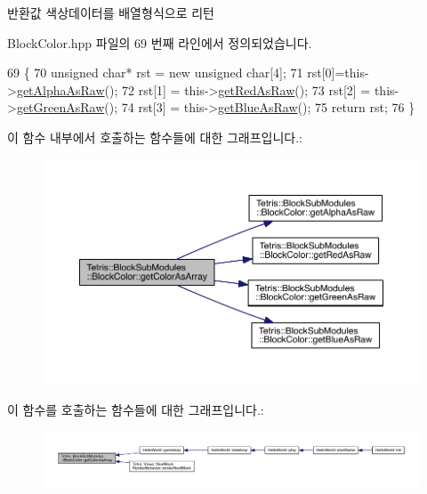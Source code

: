 \begin{DoxyReturn}{반환값}
색상데이터를 배열형식으로 리턴 
\end{DoxyReturn}


Block\+Color.\+hpp 파일의 69 번째 라인에서 정의되었습니다.


\begin{DoxyCode}
69                                             \{
70                 \textcolor{keywordtype}{unsigned} \textcolor{keywordtype}{char}* rst = \textcolor{keyword}{new} \textcolor{keywordtype}{unsigned} \textcolor{keywordtype}{char}[4];
71                 rst[0]=this->\hyperlink{class_tetris_1_1_block_sub_modules_1_1_block_color_acb1c9b34ee534857741025bd2824201a}{getAlphaAsRaw}();
72                 rst[1] = this->\hyperlink{class_tetris_1_1_block_sub_modules_1_1_block_color_a1795cf70c847d261645a9690afff7e9c}{getRedAsRaw}();
73                 rst[2] = this->\hyperlink{class_tetris_1_1_block_sub_modules_1_1_block_color_a65e9230325a2f44aa433f39c199aabcd}{getGreenAsRaw}();
74                 rst[3] = this->\hyperlink{class_tetris_1_1_block_sub_modules_1_1_block_color_ac0ad44a8b001f3824447d137357f5145}{getBlueAsRaw}();
75                 \textcolor{keywordflow}{return} rst;
76             \}
\end{DoxyCode}
이 함수 내부에서 호출하는 함수들에 대한 그래프입니다.\+:
\nopagebreak
\begin{figure}[H]
\begin{center}
\leavevmode
\includegraphics[width=350pt]{de/d44/class_tetris_1_1_block_sub_modules_1_1_block_color_ac626961ee3894d89a7fc961e9f40c92f_cgraph}
\end{center}
\end{figure}
이 함수를 호출하는 함수들에 대한 그래프입니다.\+:
\nopagebreak
\begin{figure}[H]
\begin{center}
\leavevmode
\includegraphics[width=350pt]{de/d44/class_tetris_1_1_block_sub_modules_1_1_block_color_ac626961ee3894d89a7fc961e9f40c92f_icgraph}
\end{center}
\end{figure}
